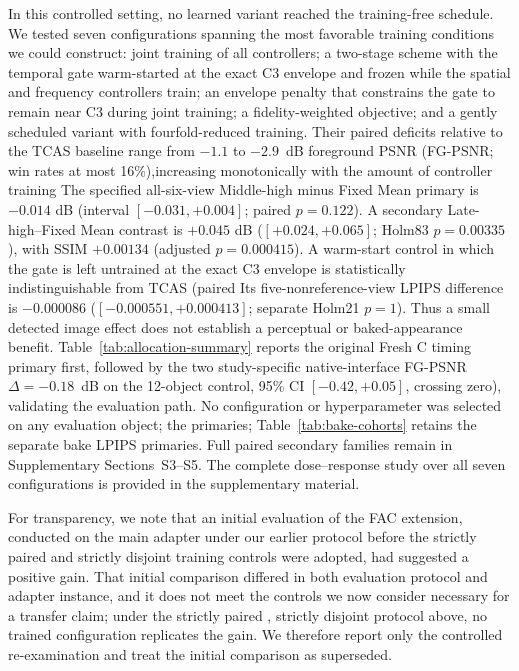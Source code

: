 \documentclass[times,twocolumn,final]{elsarticle}
\providecommand{\DIFadd}[1]{{\protect\color{blue} \sf #1}} %
\providecommand{\DIFdel}[1]{{\protect\color{red} \scriptsize #1}} %
\providecommand{\DIFaddbegin}{} %
\providecommand{\DIFaddend}{} %
\providecommand{\DIFdelbegin}{} %
\providecommand{\DIFdelend}{} %
\begin{document}
\DIFdelbegin \DIFdel{In this controlled setting, no learned variant reached the training-free schedule. We tested seven configurations spanning the most favorable training conditions we could construct: joint training of all controllers; a two-stage scheme with the temporal gate warm-started at the exact C3 envelope and frozen while the spatial and frequency controllers train; an envelope penalty that constrains the gate to remain near C3 during joint training; a fidelity-weighted objective; and a gently scheduled variant with fourfold-reduced training. Their paired deficits relative to the TCAS baseline range from $-1.1$ to $-2.9$~dB foreground PSNR (FG-PSNR; win rates at most 16\%),increasing monotonically with the amount of controller training }\DIFdelend \DIFaddbegin \DIFadd{The specified all-six-view Middle-high minus Fixed Mean primary is $-0.014$ dB (interval $[-0.031,+0.004]$; paired $p=0.122$). A secondary Late-high--Fixed Mean contrast is $+0.045$ dB ($[+0.024,+0.065]$; Holm83 $p=0.00335$), with SSIM $+0.00134$ (adjusted $p=0.000415$)}\DIFaddend . \DIFdelbegin \DIFdel{A warm-start control in which the gate is left untrained at the exact C3 envelope is statistically indistinguishable from TCAS (paired }\DIFdelend \DIFaddbegin \DIFadd{Its five-nonreference-view LPIPS difference is $-0.000086$ ($[-0.000551,+0.000413]$; separate Holm21 $p=1$). Thus a small detected image effect does not establish a perceptual or baked-appearance benefit. Table~\ref{tab:allocation-summary} reports the original Fresh C timing primary first, followed by the two study-specific native-interface }\DIFaddend FG-PSNR \DIFdelbegin \DIFdel{$\Delta=-0.18$~dB on the 12-object control, 95\% CI $[-0.42,+0.05]$, crossing zero), validating the evaluation path. No configuration or hyperparameter was selected on any evaluation object; the }\DIFdelend \DIFaddbegin \DIFadd{primaries; Table~\ref{tab:bake-cohorts} retains the separate bake LPIPS primaries. Full paired secondary families remain in Supplementary Sections~S3--S5. The }\DIFaddend complete \DIFdelbegin \DIFdel{dose--response study over all seven configurations is provided in the supplementary material. }%

\DIFdel{For transparency, we note that an initial evaluation of the FAC extension, conducted on the main adapter under our earlier protocol before the strictly paired and strictly disjoint training controls were adopted, had suggested a positive gain. That initial comparison differed in both evaluation protocol and adapter instance, and it does not meet the controls we now consider necessary for a transfer claim; under the strictly paired , strictly disjoint protocol above, no trained configuration replicates the gain. We therefore report only the controlled re-examination and treat the initial comparison as superseded.
}%
\end{document}

